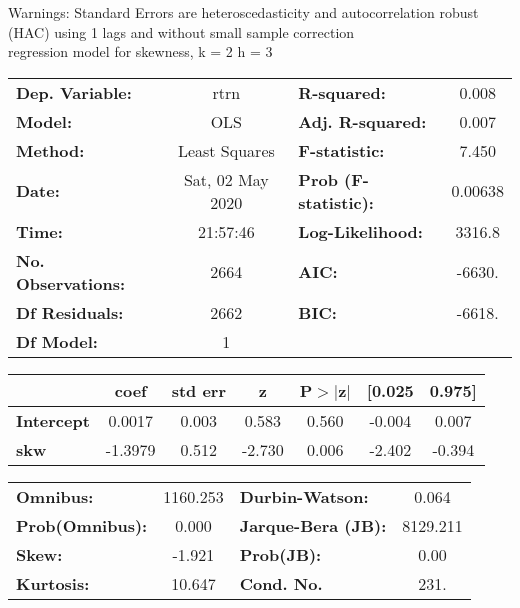 Warnings: \newline
 [1] Standard Errors are heteroscedasticity and autocorrelation robust (HAC) using 1 lags and without small sample correction\\ 

regression model for skewness, k = 2 h = 3\begin{center}
\begin{tabular}{lclc}
\toprule
\textbf{Dep. Variable:}    &       rtrn       & \textbf{  R-squared:         } &     0.008   \\
\textbf{Model:}            &       OLS        & \textbf{  Adj. R-squared:    } &     0.007   \\
\textbf{Method:}           &  Least Squares   & \textbf{  F-statistic:       } &     7.450   \\
\textbf{Date:}             & Sat, 02 May 2020 & \textbf{  Prob (F-statistic):} &  0.00638    \\
\textbf{Time:}             &     21:57:46     & \textbf{  Log-Likelihood:    } &    3316.8   \\
\textbf{No. Observations:} &        2664      & \textbf{  AIC:               } &    -6630.   \\
\textbf{Df Residuals:}     &        2662      & \textbf{  BIC:               } &    -6618.   \\
\textbf{Df Model:}         &           1      & \textbf{                     } &             \\
\bottomrule
\end{tabular}
\begin{tabular}{lcccccc}
                   & \textbf{coef} & \textbf{std err} & \textbf{z} & \textbf{P$> |$z$|$} & \textbf{[0.025} & \textbf{0.975]}  \\
\midrule
\textbf{Intercept} &       0.0017  &        0.003     &     0.583  &         0.560        &       -0.004    &        0.007     \\
\textbf{skw}       &      -1.3979  &        0.512     &    -2.730  &         0.006        &       -2.402    &       -0.394     \\
\bottomrule
\end{tabular}
\begin{tabular}{lclc}
\textbf{Omnibus:}       & 1160.253 & \textbf{  Durbin-Watson:     } &    0.064  \\
\textbf{Prob(Omnibus):} &   0.000  & \textbf{  Jarque-Bera (JB):  } & 8129.211  \\
\textbf{Skew:}          &  -1.921  & \textbf{  Prob(JB):          } &     0.00  \\
\textbf{Kurtosis:}      &  10.647  & \textbf{  Cond. No.          } &     231.  \\
\bottomrule
\end{tabular}
\end{center}

